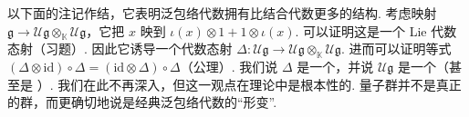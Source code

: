 \begin{numpara}[双代数结构]\label{np:lie-2-1-4}
以下面的注记作结，它表明泛包络代数拥有比结合代数更多的结构. 考虑映射 $\mathfrak g\longrightarrow\mathcal U\mathfrak g\otimes_{\mathbb K}\mathcal U\mathfrak g$，它把 $x$ 映到 $\iota(x)\otimes 1+1\otimes\iota(x)$. 可以证明这是一个 Lie 代数态射（习题）. 因此它诱导一个代数态射 $\Delta:\mathcal U\mathfrak g\longrightarrow\mathcal U\mathfrak g\otimes_{\mathbb K}\mathcal U\mathfrak g$. 进而可以证明等式 $(\Delta\otimes\mathrm{id})\circ\Delta=(\mathrm{id}\otimes\Delta)\circ\Delta$（公理）. 我们说 $\Delta$ 是一个，并说 $\mathcal U\mathfrak g$ 是一个（甚至是 ）. 我们在此不再深入，但这一观点在理论中是根本性的. 量子群并不是真正的群，而更确切地说是经典泛包络代数的``形变''.
\end{numpara}
